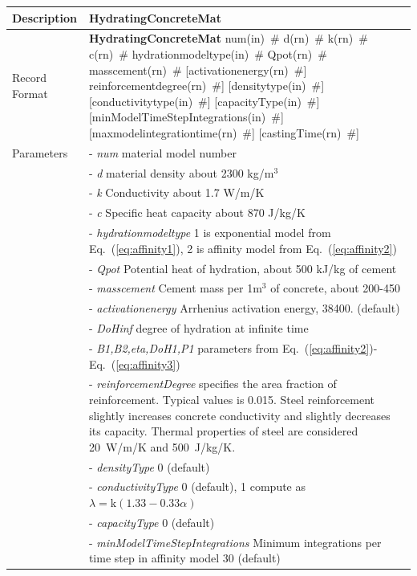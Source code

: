 \documentclass[a4paper]{article}
\newcommand{\descitem}[1]{{\noindent \bf #1}}
\newcommand{\elemparam}[2]{{{#1\tiny (#2)}~\#}}
\newcommand{\param}[1]{{\it #1}}
\newcommand{\refeq}[1]{Eq.~(\ref{#1})}
\newenvironment{mmt}{\begin{tabular}{|l|p{9cm}|}}{\end{tabular}\\}
\newenvironment{mmt}{\begin{tabular}{|l|l|}}{\end{tabular}\\}
\begin{document}
\begin{table}[!htb]
\begin{mmt}
\hline
Description & HydratingConcreteMat\\
\hline
Record Format & \descitem{HydratingConcreteMat} \elemparam{num}{in} \elemparam{d}{rn} \elemparam{k}{rn} \elemparam{c}{rn} \elemparam{hydrationmodeltype}{in} \elemparam{Qpot}{rn} \elemparam{masscement}{rn} [\elemparam{activationenergy}{rn}] \elemparam{reinforcementdegree}{rn}] [\elemparam{densitytype}{in}] [\elemparam{conductivitytype}{in}] [\elemparam{capacityType}{in}]   [\elemparam{minModelTimeStepIntegrations}{in}]  [\elemparam{maxmodelintegrationtime}{rn}] [\elemparam{castingTime}{rn}]\\
Parameters &- \param{num} material model number\\
&- \param{d} material density about 2300 kg/m$^3$\\
&- \param{k} Conductivity about 1.7 W/m/K\\
&- \param{c} Specific heat capacity about 870 J/kg/K\\
&- \param{hydrationmodeltype} 1 is exponential model from \refeq{eq:affinity1}, 2 is affinity model from \refeq{eq:affinity2}\\
&- \param{Qpot} Potential heat of hydration, about 500 kJ/kg of cement\\
&- \param{masscement} Cement mass per 1m$^3$ of concrete, about 200-450\\
&- \param{activationenergy} Arrhenius activation energy, 38400. (default)\\
&- \param{DoHinf} degree of hydration at infinite time\\
&- \param{B1,B2,eta,DoH1,P1} parameters from \refeq{eq:affinity2}-\refeq{eq:affinity3}\\
&- \param{reinforcementDegree} specifies the area fraction of reinforcement. Typical values is 0.015. Steel reinforcement slightly increases concrete conductivity and slightly decreases its capacity. Thermal properties of steel are considered 20~W/m/K and 500~J/kg/K.\\
&- \param{densityType} 0 (default)\\
&- \param{conductivityType} 0 (default), 1 compute as $\lambda = \textrm{k} (1.33-0.33\alpha)$ \cite{Ruiz:01}\\
&- \param{capacityType} 0 (default)\\
&- \param{minModelTimeStepIntegrations} Minimum integrations per time step in affinity model 30 (default)\\

\end{mmt}
\end{table}
\end{document}
